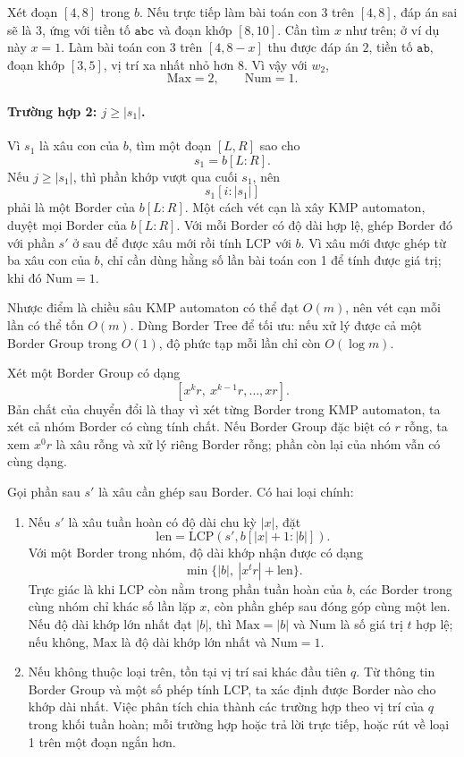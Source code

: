 \documentclass[11pt]{article}
\begin{document}
Xét đoạn \([4,8]\) trong \(b\). Nếu trực tiếp làm bài toán con 3 trên
\([4,8]\), đáp án sai sẽ là \(3\), ứng với tiền tố \(\texttt{abc}\) và đoạn
khớp \([8,10]\). Cần tìm \(x\) như trên; ở ví dụ này \(x=1\). Làm bài toán con
3 trên \([4,8-x]\) thu được đáp án \(2\), tiền tố \(\texttt{ab}\), đoạn khớp
\([3,5]\), vị trí xa nhất nhỏ hơn \(8\). Vì vậy với \(w_2\),
\[
  \mathrm{Max}=2,\qquad \mathrm{Num}=1.
\]

\paragraph{Trường hợp 2: \(j\ge |s_1|\).}
Vì \(s_1\) là xâu con của \(b\), tìm một đoạn \([L,R]\) sao cho
\[
  s_1=b[L:R].
\]
Nếu \(j\ge |s_1|\), thì phần khớp vượt qua cuối \(s_1\), nên
\[
  s_1[i:|s_1|]
\]
phải là một Border của \(b[L:R]\). Một cách vét cạn là xây KMP automaton, duyệt
mọi Border của \(b[L:R]\). Với mỗi Border có độ dài hợp lệ, ghép Border đó với
phần \(s'\) ở sau để được xâu mới rồi tính LCP với \(b\). Vì xâu mới được ghép
từ ba xâu con của \(b\), chỉ cần dùng hằng số lần bài toán con 1 để tính được
giá trị; khi đó \(\mathrm{Num}=1\).

Nhược điểm là chiều sâu KMP automaton có thể đạt \(O(m)\), nên vét cạn mỗi lần
có thể tốn \(O(m)\). Dùng Border Tree để tối ưu: nếu xử lý được cả một Border
Group trong \(O(1)\), độ phức tạp mỗi lần chỉ còn \(O(\log m)\).

Xét một Border Group có dạng
\[
  [x^kr,\ x^{k-1}r,\ldots,xr].
\]
Bản chất của chuyển đổi là thay vì xét từng Border trong KMP automaton, ta xét
cả nhóm Border có cùng tính chất. Nếu Border Group đặc biệt có \(r\) rỗng, ta
xem \(x^0r\) là xâu rỗng và xử lý riêng Border rỗng; phần còn lại của nhóm vẫn
có cùng dạng.

Gọi phần sau \(s'\) là xâu cần ghép sau Border. Có hai loại chính:
\begin{enumerate}
  \item Nếu \(s'\) là xâu tuần hoàn có độ dài chu kỳ \(|x|\), đặt
  \[
    \mathrm{len}=\mathrm{LCP}(s',b[|x|+1:|b|]).
  \]
  Với một Border trong nhóm, độ dài khớp nhận được có dạng
  \[
    \min\{|b|,\ |x^tr|+\mathrm{len}\}.
  \]
  Trực giác là khi LCP còn nằm trong phần tuần hoàn của \(b\), các Border trong
  cùng nhóm chỉ khác số lần lặp \(x\), còn phần ghép sau đóng góp cùng một
  \(\mathrm{len}\). Nếu độ dài khớp lớn nhất đạt \(|b|\), thì \(\mathrm{Max}=|b|\)
  và \(\mathrm{Num}\) là số giá trị \(t\) hợp lệ; nếu không, \(\mathrm{Max}\) là
  độ dài khớp lớn nhất và \(\mathrm{Num}=1\).
  \item Nếu không thuộc loại trên, tồn tại vị trí sai khác đầu tiên \(q\). Từ
  thông tin Border Group và một số phép tính LCP, ta xác định được Border nào
  cho khớp dài nhất. Việc phân tích chia thành các trường hợp theo vị trí của
  \(q\) trong khối tuần hoàn; mỗi trường hợp hoặc trả lời trực tiếp, hoặc rút
  về loại 1 trên một đoạn ngắn hơn.
\end{enumerate}
\end{document}
